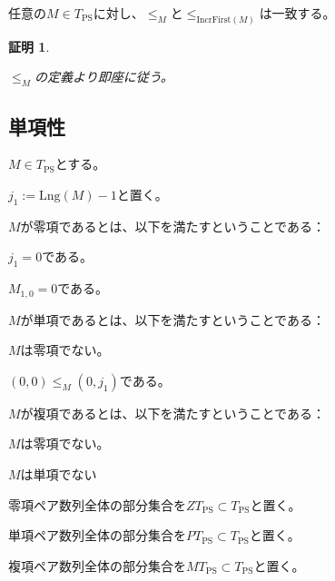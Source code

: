 \documentclass[dvipdfmx,uplatex]{jsarticle}
\theoremstyle{customnonumberbreakfortheorem}
\theoremstyle{customnonumberbreakforproof}
\newtheorem{hideableproof}{証明}
\begin{document}
\begin{proposition}\label{leq_MのIncrFirst不変性}
	任意の\(M \in T_{\textrm{PS}}\)に対し、\(\leq_M\)と\(\leq_{\textrm{IncrFirst}(M)}\)は一致する。
\end{proposition}

\begin{hideableproof}
	\begin{indented}
		\item \(\leq_M\)の定義より即座に従う。
	\end{indented}
\end{hideableproof}


\subsection{単項性}

\(M \in T_{\textrm{PS}}\)とする。
\begin{nenumerate}
	\item \(j_1 := \textrm{Lng}(M)-1\)と置く。
	\item \(M\)が零項であるとは、以下を満たすということである：
	\begin{nenumerate}
		\item \(j_1= 0\)である。
		\item \(M_{1,0} = 0\)である。
	\end{nenumerate}
	\item \(M\)が単項であるとは、以下を満たすということである：
	\begin{nenumerate}
		\item \(M\)は零項でない。
		\item \((0,0) \leq_M (0,j_1)\)である。
	\end{nenumerate}
	\item \(M\)が複項であるとは、以下を満たすということである：
	\begin{nenumerate}
		\item \(M\)は零項でない。
		\item \(M\)は単項でない
	\end{nenumerate}
	\item 零項ペア数列全体の部分集合を\(ZT_{\textrm{PS}} \subset T_{\textrm{PS}}\)と置く。
	\item 単項ペア数列全体の部分集合を\(PT_{\textrm{PS}} \subset T_{\textrm{PS}}\)と置く。
	\item 複項ペア数列全体の部分集合を\(MT_{\textrm{PS}} \subset T_{\textrm{PS}}\)と置く。
\end{nenumerate}
\end{document}
